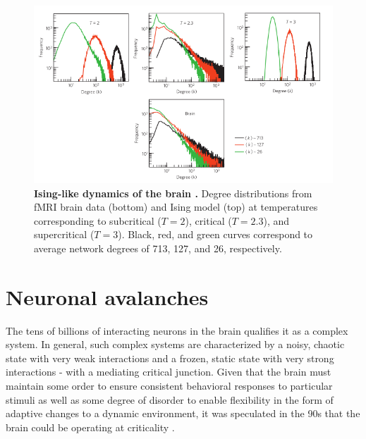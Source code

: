 \documentclass[12pt]{article}
\begin{document}
\begin{figure}      
  \begin{center}    
 \includegraphics[width=.8\textwidth]{isinglikedynamicschialvo}    
    \caption{\textbf{Ising-like dynamics of the brain \cite{Fraiman2009a}.} Degree distributions from fMRI brain data (bottom) and Ising model (top) at temperatures corresponding to subcritical ($T=2$), critical ($T=2.3$), and supercritical ($T=3$). Black, red, and green curves correspond to average network degrees of 713, 127, and 26, respectively.}
   \label{Figure::Ising model and the brain at criticality}   
  \end{center}     
   \end{figure}
  
\section*{Neuronal avalanches}

The tens of billions of interacting neurons in the brain qualifies it as a complex system. In general, such complex systems are characterized by a noisy, chaotic state with very weak interactions and a frozen, static state with very strong interactions - with a mediating critical junction. Given that the brain must maintain some order to ensure consistent behavioral responses to particular stimuli as well as some degree of disorder to enable flexibility in the form of adaptive changes to a dynamic environment, it was speculated in the 90s that the brain could be operating at criticality \cite{Bak1987a}.
\end{document}
